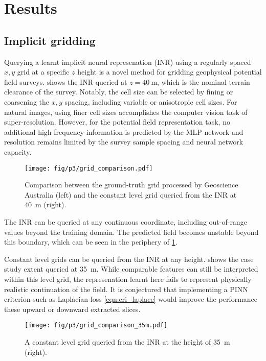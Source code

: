\documentclass[manuscript.tex]{subfiles}
\begin{document}
\section{Results}
\subsection{Implicit gridding}
Querying a learnt implicit neural represenation (INR) using a regularly spaced \(x,y\) grid at a specific \(z\) height is a novel method for gridding geophysical potential field surveys.
 shows the INR queried at \(z=\SI{40}{\meter}\), which is the nominal terrain clearance of the survey.
Notably, the cell size can be selected by fining or coarsening the \(x,y\) spacing, including variable or anisotropic cell sizes.
For natural images, using finer cell sizes accomplishes the computer vision task of super-resolution.
However, for the potential field representation task, no additional high-frequency information is predicted by the MLP network and resolution remains limited by the survey sample spacing and neural network capacity.

\begin{figure}[hbt]
    \centering{}
    \texttt{[image: fig/p3/grid\_comparison.pdf]}
    \caption[Grid prediction]{Comparison between the ground-truth grid processed by Geoscience Australia (left) and the constant level grid queried from the INR at \SI{40}{\m} (right).}
    \label{fig:grid}
\end{figure}

The INR can be queried at any continuous coordinate, including out-of-range values beyond the training domain.
The predicted field becomes unstable beyond this boundary, which can be seen in the periphery of \cref{fig:grid}.

Constant level grids can be queried from the INR at any height.
 shows the case study extent queried at \SI{35}{\m}.
While comparable features can still be interpreted within this level grid, the represenation learnt here fails to represent physically realistic continuation of the field.
It is conjectured that implementing a PINN criterion such as Laplacian loss \cref{eqn:cri_laplace} would improve the performance these upward or downward extracted slices.

\begin{figure}[hbt]
    \centering{}
    \texttt{[image: fig/p3/grid\_comparison\_35m.pdf]}
    \caption[Grid prediction]{A constant level grid queried from the INR at the height of \SI{35}{\m} (right).}
    \label{fig:grid35}
\end{figure}
\end{document}
